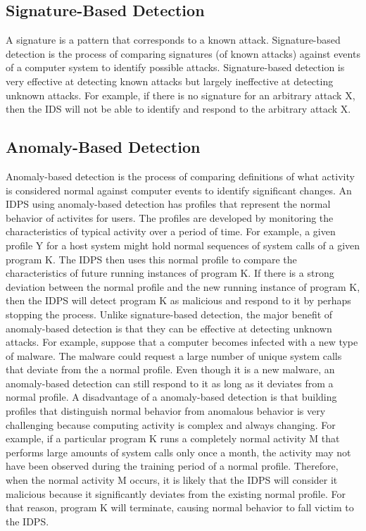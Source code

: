 \documentclass{report}
\begin{document}
\begin{spacing}{1.5}
\subsection{Signature-Based Detection}

{\large
A signature is a pattern that corresponds to a known attack. Signature-based detection is the process of comparing signatures (of known attacks) against events of a computer system to identify possible attacks. Signature-based detection is very effective at detecting known attacks but largely ineffective at detecting unknown attacks. For example, if there is no signature for an arbitrary attack X, then the IDS will not be able to identify and respond to the arbitrary attack X.
\newline
}


\subsection{Anomaly-Based Detection}

{\large
Anomaly-based detection is the process of comparing definitions of what activity is considered
normal against computer events to identify significant changes. An IDPS using anomaly-based detection has profiles that represent the normal behavior of activites for  users. The profiles are developed by monitoring the characteristics of
typical activity over a period of time. For example, a given profile Y for a host system might hold normal sequences of system calls of a given program K. The IDPS then uses this normal profile to compare the characteristics of future running instances of program K. If there is a strong deviation between the normal profile and the new running instance of program K, then the IDPS will detect program K as malicious and respond to it by perhaps stopping the process. Unlike signature-based detection, the major benefit of anomaly-based detection is that they can be effective at detecting unknown attacks. For example, suppose that a computer becomes infected with a new type of malware. The malware could request a large number of unique system calls that deviate from the a normal profile. Even though it is a new malware, an anomaly-based detection can still respond to it as long as it deviates from a normal profile. A disadvantage of a anomaly-based detection is that building profiles that distinguish normal behavior from anomalous behavior is very challenging because computing activity is complex and always changing. For example, if a particular program K runs a completely normal activity M that performs large amounts of system calls only once a month, the activity may not have been observed during the training period of a normal profile. Therefore, when the normal activity M occurs, it is likely that the IDPS will consider it malicious because it significantly deviates from the existing normal profile. For that reason, program K will terminate, causing normal behavior to fall victim to the IDPS. 
\newline
}



\end{spacing}
\end{document}
